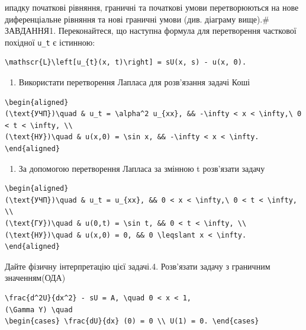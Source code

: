 \documentclass[
  ukrainian,
]{article}
\providecommand{\tightlist}{%
  \setlength{\itemsep}{0pt}\setlength{\parskip}{0pt}}
\begin{document}
ипадку початкові рівняння, граничні та початкові умови перетворюються на
нове диференціальне рівняння та нові граничні умови (див. діаграму
вище).\# ЗАВДАННЯ1. Переконайтеся, що наступна формула для перетворення
часткової похідної \texttt{u\_t} є істинною:

\begin{verbatim}
\mathscr{L}\left[u_{t}(x, t)\right] = sU(x, s) - u(x, 0).
\end{verbatim}

\begin{enumerate}
\def\labelenumi{\arabic{enumi}.}
\setcounter{enumi}{1}
\tightlist
\item
  Використати перетворення Лапласа для розв'язання задачі Коші
\end{enumerate}

\begin{verbatim}
\begin{aligned}
(\text{УЧП})\quad & u_t = \alpha^2 u_{xx}, && -\infty < x < \infty,\ 0 < t < \infty, \\
(\text{НУ})\quad & u(x,0) = \sin x, && -\infty < x < \infty.
\end{aligned}
\end{verbatim}

\begin{enumerate}
\def\labelenumi{\arabic{enumi}.}
\setcounter{enumi}{2}
\tightlist
\item
  За допомогою перетворення Лапласа за змінною t розв'язати задачу
\end{enumerate}

\begin{verbatim}
\begin{aligned}
(\text{УЧП})\quad & u_t = u_{xx}, && 0 < x < \infty,\ 0 < t < \infty, \\
(\text{ГУ})\quad & u(0,t) = \sin t, && 0 < t < \infty, \\
(\text{НУ})\quad & u(x,0) = 0, && 0 \leqslant x < \infty.
\end{aligned}
\end{verbatim}

Дайте фізичну інтерпретацію цієї задачі.4. Розв'язати задачу з граничним
значенням(ОДА)

\begin{verbatim}
\frac{d^2U}{dx^2} - sU = A, \quad 0 < x < 1,
(\Gamma Y) \quad
\begin{cases} \frac{dU}{dx} (0) = 0 \\ U(1) = 0. \end{cases}
\end{verbatim}
\end{document}
